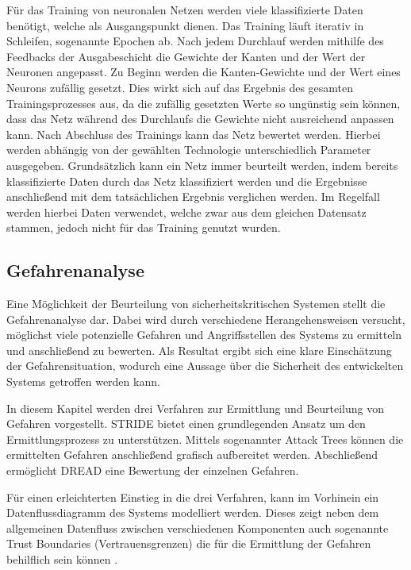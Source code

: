 Für das Training von neuronalen Netzen werden viele klassifizierte Daten benötigt, welche als Ausgangspunkt dienen.
Das Training läuft iterativ in Schleifen, sogenannte Epochen ab.
Nach jedem Durchlauf werden mithilfe des Feedbacks der Ausgabeschicht die Gewichte der Kanten und der Wert der Neuronen angepasst.
Zu Beginn werden die Kanten-Gewichte und der Wert eines Neurons zufällig gesetzt.
Dies wirkt sich auf das Ergebnis des gesamten Trainingsprozesses aus, da die zufällig gesetzten Werte so ungünstig sein können, dass das Netz während des Durchlaufs die Gewichte nicht ausreichend anpassen kann.
Nach Abschluss des Trainings kann das Netz bewertet werden.
Hierbei werden abhängig von der gewählten Technologie unterschiedlich Parameter ausgegeben.
Grundsätzlich kann ein Netz immer beurteilt werden, indem bereits klassifizierte Daten durch das Netz klassifiziert werden und die Ergebnisse anschließend mit dem tatsächlichen Ergebnis verglichen werden.
Im Regelfall werden hierbei Daten verwendet, welche zwar aus dem gleichen Datensatz stammen, jedoch nicht für das Training genutzt wurden.
\autocite[vgl.][]{marcel_mikl_wie_2018}

\subsection{Gefahrenanalyse}
Eine Möglichkeit der Beurteilung von sicherheitskritischen Systemen stellt die Gefahrenanalyse dar.
Dabei wird durch verschiedene Herangehensweisen versucht, möglichst viele potenzielle Gefahren und Angriffsstellen des Systems zu ermitteln und anschließend zu bewerten.
Als Resultat ergibt sich eine klare Einschätzung der Gefahrensituation, wodurch eine Aussage über die Sicherheit des entwickelten Systems getroffen werden kann.

In diesem Kapitel werden drei Verfahren zur Ermittlung und Beurteilung von Gefahren vorgestellt.
STRIDE bietet einen grundlegenden Ansatz um den Ermittlungsprozess zu unterstützen.
Mittels sogenannter Attack Trees können die ermittelten Gefahren anschließend grafisch aufbereitet werden.
Abschließend ermöglicht DREAD eine Bewertung der einzelnen Gefahren.

Für einen erleichterten Einstieg in die drei Verfahren, kann im Vorhinein ein Datenflussdiagramm des Systems modelliert werden.
Dieses zeigt neben dem allgemeinen Datenfluss zwischen verschiedenen Komponenten auch sogenannte Trust Boundaries (Vertrauensgrenzen) die für die Ermittlung der Gefahren behilflich sein können \autocite[vgl.][S. 14]{bundesamt_fur_sicherheit_in_der_informationstechnik_leitfaden_nodate}.


